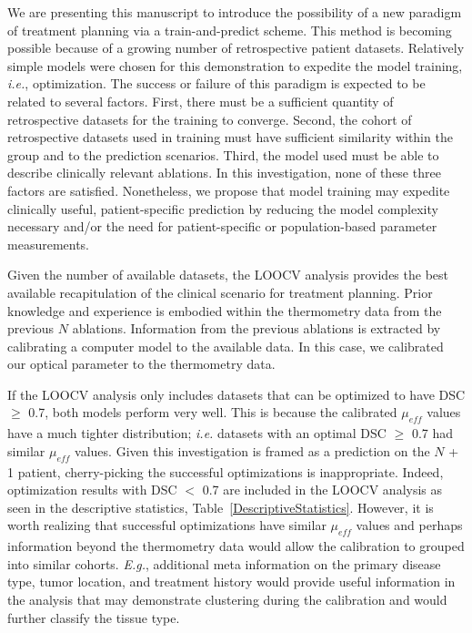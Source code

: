 \documentclass[12pt]{article}
\begin{document}
{\color{red}We are presenting this manuscript to introduce the possibility
of a new paradigm of treatment planning via a train-and-predict scheme.
This method is becoming possible because of a growing number of retrospective patient
datasets. Relatively simple models were chosen for this demonstration
to expedite the model training, \textit{i.e.}, optimization. The success
or failure of this paradigm is expected to be related to several factors.
First, there must be a sufficient quantity of retrospective datasets
for the training to converge. Second, the cohort of retrospective
datasets used in training must have sufficient similarity within the group
and to the prediction scenarios. Third, the model used must be able 
to describe clinically relevant ablations. In this investigation,
none of these three factors are satisfied. Nonetheless,
we propose that model training may expedite clinically useful,
patient-specific prediction by reducing the model complexity necessary
and/or the need for patient-specific or population-based parameter
measurements. }


{\color{red}Given the number of available datasets, the LOOCV analysis
provides the best available recapitulation of the clinical scenario}
for treatment planning. Prior knowledge and experience is embodied
within the thermometry data from the previous $N$ ablations.
Information from the previous ablations is extracted by calibrating
a computer model to the available data. 
In this case, we calibrated our optical parameter to the thermometry data.



If the LOOCV analysis only includes datasets that can be optimized to
have DSC $\geq$ 0.7, both models perform very well. This is because
the calibrated $\mu_\textit{eff}$ values have a much tighter distribution;
\textit{i.e.} datasets with an optimal DSC $\geq$ 0.7 had similar $\mu_\textit{eff}$ values.
Given this investigation is framed as a prediction on the $N$ + 1 patient,
cherry-picking the successful optimizations is inappropriate. Indeed, optimization results
with DSC $<$ 0.7 are included in the LOOCV analysis as seen in the descriptive statistics,
Table~\ref{DescriptiveStatistics}. However,
it is worth realizing that successful optimizations have similar
$\mu_\textit{eff}$ values and perhaps information beyond the
thermometry data would allow the calibration to grouped into similar cohorts.
\textit{E.g.}, additional meta information on the primary disease type, tumor location, and treatment history
would provide
useful information in the analysis that may demonstrate clustering during the calibration
and would further classify the tissue type.
\end{document}
